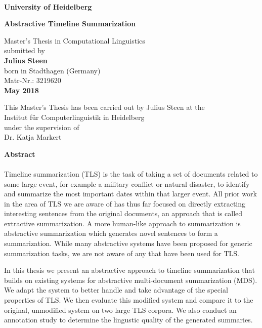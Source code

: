 \documentclass[a4paper,BCOR=10mm]{report}
\numberwithin{lemma}{chapter}
\numberwithin{definition}{chapter}
\begin{document}
\begin{titlepage}
\begin{center}
 
\Large\textbf{\\
University of Heidelberg}
\vspace{2cm}

\Huge\textbf{
Abstractive Timeline Summarization
}

\vspace{10cm}

\normalsize
Master's Thesis in Computational Linguistics\\
submitted by\\
\vspace{0.5cm}
\Large\textbf{Julius Steen}\\
\normalsize
\vspace{0.5cm}
born in Stadthagen (Germany)\\
\normalsize
Matr-Nr.: 3219620 \\
\vspace{0.5cm}
\Large\textbf{May 2018} \\
\normalsize

\newpage

\normalsize
This Master's Thesis has been carried out by Julius Steen at the\\
Institut für Computerlinguistik in Heidelberg\\
under the supervision of\\
Dr. Katja Markert
\vfill
\end{center}

\newpage
\noindent
\large\textbf{Abstract}\\
\\

Timeline summarization (TLS) is the task of taking a set of documents related to some large event, for example a military conflict or natural disaster, to identify and summarize the most important dates within that larger event.
All prior work in the area of TLS we are aware of has thus far focused on directly extracting interesting sentences from the original documents, an approach that is called extractive summarization. A more human-like approach to summarization is abstractive summarization which generates novel sentences to form a summarization. While many abstractive systems have been proposed for generic summarization tasks, we are not aware of any that have been used for TLS.

In this thesis we present an abstractive approach to timeline summarization that builds on existing systems for abstractive multi-document summarization (MDS). We adapt the system to better handle and take advantage of the special properties of TLS. We then evaluate this modified system and compare it to the original, unmodified system on two large TLS corpora.
We also conduct an annotation study to determine the lingustic quality of the generated summaries.


\end{titlepage}
\end{document}
